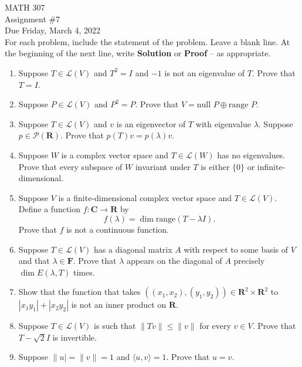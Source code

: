 \documentclass[12pt]{article}
\begin{document}
\noindent MATH 307 \\
Assignment \#7 \\  %
Due Friday, March 4, 2022 \\

For each problem, include the statement of the problem. Leave a blank line.  At the beginning of the next line, write \textbf{Solution} or \textbf{Proof} -- as appropriate.

\begin{enumerate}
\item Suppose $T \in \mathcal{L}(V)$ and $T^2 = I$ and $-1$ is not an eigenvalue of $T$.  Prove that $T = I$.

\item Suppose $P \in \mathcal{L}(V)$ and $P^2=P$.  Prove that $V = \text{null }P \oplus \text{range } P$.


\item Suppose $T \in \mathcal{L}(V)$ and $v$ is an eigenvector of $T$ with eigenvalue $\lambda$.  Suppose $p \in \mathcal{P}(\mathbf{R})$.  Prove that $p(T)v = p(\lambda)v$.

\item Suppose $W$ is a complex vector space and $T \in \mathcal{L}(W)$ has no eigenvalues.  Prove that every subspace of $W$ invariant under $T$ is either $\{0\}$ or infinite-dimensional.

\item Suppose $V$ is a finite-dimensional complex vector space and $T \in \mathcal{L}(V)$.  Define a function $f: \mathbf{C} \to \mathbf{R}$ by
    \[
        f(\lambda) = \dim \text{range}(T- \lambda I).
    \]
    Prove that $f$ is not a continuous function.

\item Suppose $T \in \mathcal{L}(V)$ has a diagonal matrix $A$ with respect to some basis of $V$ and that $\lambda \in \mathbf{F}$.  Prove that $\lambda$ appears on the diagonal of $A$ precisely $\dim E(\lambda , T)$ times.

\item Show that the function that takes $((x_1,x_2) , (y_1,y_2)) \in \mathbf{R}^2 \times \mathbf{R}^2$ to $|x_1y_1| + |x_2y_2|$ is not an inner product on $\mathbf{R}$.

\item Suppose $T \in \mathcal{L}(V)$ is such that $\|Tv\| \le \|v\|$ for every $v \in V$.  Prove that $T - \sqrt{2} I$ is invertible.

\item Suppose $\|u| = \|v\| = 1$ and $\langle u , v \rangle = 1$.  Prove that $u = v$.


\end{enumerate}
\end{document}
